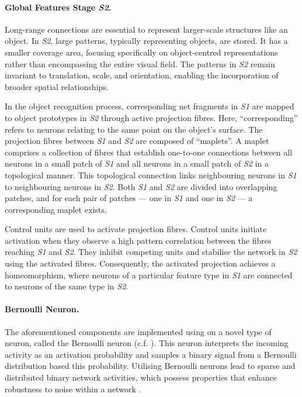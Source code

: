 \paragraph{Global Features Stage \emph{S2}.} Long-range connections are essential to represent larger-scale structures like an object. In \emph{S2}, large patterns, typically representing objects, are stored. 
It has a smaller coverage area, focusing specifically on object-centred representations rather than encompassing the entire visual field.
The patterns in \emph{S2} remain invariant to translation, scale, and orientation, enabling the incorporation of broader spatial relationships.

In the object recognition process, corresponding net fragments in \emph{S1} are mapped to object prototypes in \emph{S2} through active projection fibres. Here, ``corresponding'' refers to neurons relating to the same point on the object's surface.
The projection fibres between \emph{S1} and \emph{S2} are composed of ``maplets''. A maplet comprises a collection of fibres that establish one-to-one connections between all neurons in a small patch of \emph{S1} and all neurons in a small patch of \emph{S2} in a topological manner. This topological connection links neighbouring neurons in \emph{S1} to neighbouring neurons in \emph{S2}. Both \emph{S1} and \emph{S2} are divided into overlapping patches, and for each pair of patches — one in \emph{S1} and one in \emph{S2} — a corresponding maplet exists.

Control units are used to activate projection fibres.
Control units initiate activation when they observe a high pattern correlation between the fibres reaching \emph{S1} and \emph{S2}. They inhibit competing units and stabilise the network in \emph{S2} using the activated fibres. Consequently, the activated projection achieves a homeomorphism, where neurons of a particular feature type in \emph{S1} are connected to neurons of the same type in \emph{S2}.

\paragraph{Bernoulli Neuron.} The aforementioned components are implemented using on a novel type of neuron, called the Bernoulli neuron (c.f. ). This neuron interprets the incoming activity as an activation probability and samples a binary signal from a Bernoulli distribution based this probability. Utilising Bernoulli neurons lead to sparse and distributed binary network activities, which possess properties that enhance robustness to noise within a network .

